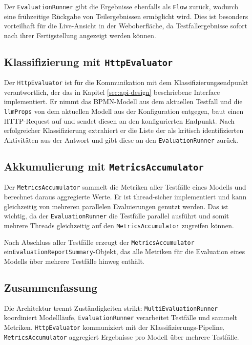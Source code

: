 Der \texttt{EvaluationRunner} gibt die Ergebnisse ebenfalls als \texttt{Flow} zurück, wodurch eine frühzeitige Rückgabe von Teilergebnissen ermöglicht wird. Dies ist besonders vorteilhaft für die Live-Ansicht in der Weboberfläche, da Testfallergebnisse sofort nach ihrer Fertigstellung angezeigt werden können.

\subsection*{Klassifizierung mit \texttt{HttpEvaluator}}

Der \texttt{HttpEvaluator} ist für die Kommunikation mit dem Klassifizierungsendpunkt verantwortlich, der das in Kapitel \ref{sec:api-design} beschriebene Interface implementiert. Er nimmt das \ac{BPMN}-Modell aus dem aktuellen Testfall und die \texttt{llmProps} von dem aktuellen Modell aus der Konfiguration entgegen, baut einen HTTP-Request auf und sendet diesen an den konfigurierten Endpunkt. Nach erfolgreicher Klassifizierung extrahiert er die Liste der als kritisch identifizierten Aktivitäten aus der Antwort und gibt diese an den \texttt{EvaluationRunner} zurück.

\subsection*{Akkumulierung mit \texttt{MetricsAccumulator}}

Der \texttt{MetricsAccumulator} sammelt die Metriken aller Testfälle eines Modells und berechnet daraus aggregierte Werte. Er ist thread-sicher implementiert und kann gleichzeitig von mehreren parallelen Evaluierungen genutzt werden. Das ist wichtig, da der \texttt{EvaluationRunner} die Testfälle parallel ausführt und somit mehrere Threads gleichzeitig auf den \texttt{MetricsAccumulator} zugreifen können.

Nach Abschluss aller Testfälle erzeugt der \texttt{MetricsAccumulator} ein\break \texttt{EvaluationReportSummary}-Objekt, das alle Metriken für die Evaluation eines Modells über mehrere Testfälle hinweg enthält.

\subsection*{Zusammenfassung}

Die Architektur trennt Zuständigkeiten strikt:
\texttt{MultiEvaluationRunner} koordiniert Modellläufe,
\texttt{EvaluationRunner} verarbeitet Testfälle und sammelt Metriken,
\texttt{HttpEvaluator} kommuniziert mit der Klassifizierungs-Pipeline,
\texttt{MetricsAccumulator} aggregiert Ergebnisse pro Modell über mehrere Testfälle.
